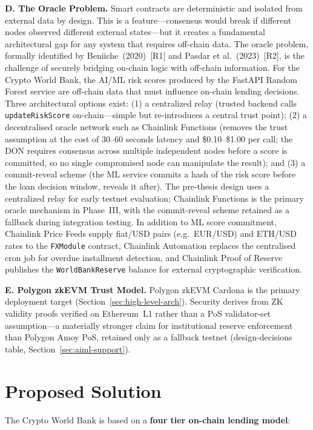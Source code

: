 \documentclass[12pt,a4paper]{report}
\begin{document}
\textbf{D. The Oracle Problem.}
Smart contracts are deterministic and isolated from external data by design. This is a feature---consensus would break if different nodes observed different external states---but it creates a fundamental architectural gap for any system that requires off-chain data. The oracle problem, formally identified by Beniiche~(2020)~[R1] and Pasdar et al.~(2023)~[R2], is the challenge of securely bridging on-chain logic with off-chain information. For the Crypto World Bank, the AI/ML risk scores produced by the FastAPI Random Forest service are off-chain data that must influence on-chain lending decisions. Three architectural options exist: (1) a centralized relay (trusted backend calls \texttt{updateRiskScore} on-chain---simple but re-introduces a central trust point); (2) a decentralised oracle network such as Chainlink Functions (removes the trust assumption at the cost of 30--60 seconds latency and \$0.10--\$1.00 per call; the DON requires consensus across multiple independent nodes before a score is committed, so no single compromised node can manipulate the result); and (3) a commit-reveal scheme (the ML service commits a hash of the risk score before the loan decision window, reveals it after). The pre-thesis design uses a centralized relay for early testnet evaluation; Chainlink Functions is the primary oracle mechanism in Phase~III, with the commit-reveal scheme retained as a fallback during integration testing. In addition to ML score commitment, Chainlink Price Feeds supply fiat/USD pairs (e.g.\ EUR/USD) and ETH/USD rates to the \texttt{FXModule} contract, Chainlink Automation replaces the centralised cron job for overdue installment detection, and Chainlink Proof of Reserve publishes the \texttt{WorldBankReserve} balance for external cryptographic verification.

\textbf{E. Polygon zkEVM Trust Model.}
Polygon zkEVM Cardona is the primary deployment target (Section~\ref{sec:high-level-arch}). Security derives from ZK validity proofs verified on Ethereum~L1 rather than a PoS validator-set assumption---a materially stronger claim for institutional reserve enforcement than Polygon Amoy PoS, retained only as a fallback testnet (design-decisions table, Section~\ref{sec:aiml-support}).

\section{Proposed Solution}
\label{sec:proposed-solution}

The Crypto World Bank is based on a \textbf{four tier on-chain lending model}:
\end{document}
